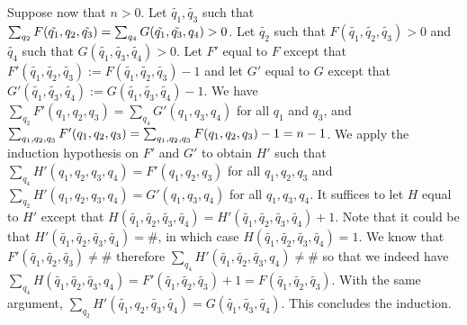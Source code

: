 \documentclass[10pt,a4paper]{article}
\newcommand{\deff}{:=}
\newcommand*{\dummysymb}{\#}
\begin{document}
\begin{appendixproof}
	Suppose now that \(n>0\).
	Let \(\tilde{q_1}, \tilde{q_3}\) such that \(\sum_{q_2} F(\tilde{q_1}, q_2,\tilde{q_3}) = \linebreak \sum_{q_4} G(\tilde{q_1},\tilde{q_3},q_4)>0\).
	Let \(\tilde{q_2}\) such that \(F(\tilde{q_1}, \tilde{q_2},\tilde{q_3})>0\) and \(\tilde{q_4}\) such that \(G(\tilde{q_1},\tilde{q_3},\tilde{q_4})>0\).
	Let \(F'\) equal to \(F\) except that \(F'(\tilde{q_1}, \tilde{q_2},\tilde{q_3}) \deff F(\tilde{q_1}, \tilde{q_2},\tilde{q_3})-1\) and let \(G'\) equal to \(G\) except that \(G'(\tilde{q_1},\tilde{q_3},\tilde{q_4}) \deff G(\tilde{q_1},\tilde{q_3},\tilde{q_4})-1\).
	We have \(\sum_{q_2} F'(q_1,q_2,q_3) = \sum_{q_4} G'(q_1,q_3,q_4)\) for all \(q_1\) and \(q_3\), and \(\sum_{q_1,q_2,q_3} F'(q_1,q_2,q_3) = \linebreak \sum_{q_1,q_2,q_3} F(q_1,q_2,q_3)-1 = n-1\).
	We apply the induction hypothesis on \(F'\) and \(G'\) to obtain \(H'\) such that \(\sum_{q_4} H'(q_1,q_2,q_3,q_4) = F'(q_1,q_2,q_3)\) for all \(q_1,q_2,q_3\) and \(\sum_{q_2} H'(q_1,q_2,q_3,q_4) = G'(q_1,q_3,q_4)\) for all \(q_1,q_3,q_4\).
	It suffices to let \(H\) equal to \(H'\) except that \(H(\tilde{q_1}, \tilde{q_2}, \tilde{q_3},\tilde{q_4}) = H'(\tilde{q_1}, \tilde{q_2}, \tilde{q_3},\tilde{q_4})+1\).
	Note that it could be that \(H'(\tilde{q_1}, \tilde{q_2}, \tilde{q_3},\tilde{q_4}) = \dummysymb\), in which case \(H(\tilde{q_1}, \tilde{q_2}, \tilde{q_3},\tilde{q_4}) = 1\).
	We know that \(F'(\tilde{q_1}, \tilde{q_2}, \tilde{q_3}) \ne \dummysymb\) therefore \(\sum_{q_4} H'(\tilde{q_1}, \tilde{q_2}, \tilde{q_3},q_4) \ne \dummysymb\) so that we indeed have \(\sum_{q_4} H(\tilde{q_1}, \tilde{q_2}, \tilde{q_3},q_4) = F'(\tilde{q_1}, \tilde{q_2}, \tilde{q_3})+1 = F(\tilde{q_1}, \tilde{q_2}, \tilde{q_3})\).
	With the same argument, \(\sum_{q_2} H'(\tilde{q_1}, q_2, \tilde{q_3},\tilde{q_4}) = G(\tilde{q_1}, \tilde{q_3},\tilde{q_4})\).
	This concludes the induction.


\end{appendixproof}
\end{document}
